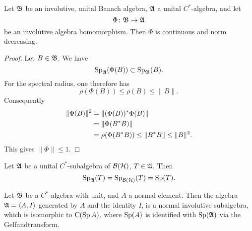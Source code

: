 \begin{prop}\label{conthomo}
 Let $\mathfrak{B}$ be an involutive, unital Banach algebra, $\mathfrak{A}$ a unital $C^*$-algebra, and let
\[
  \Phi \colon \mathfrak{B} \to \mathfrak{A} 
\]
be an involutive algebra homomorphism.
Then $\Phi$ is continuous and norm decreasing.
\end{prop}
\begin{proof}
 Let $B \in \mathfrak{B}$. We have
\[
  \operatorname{Sp}_{\mathfrak{A}} (\Phi (B)) \subset \operatorname{Sp}_{\mathfrak{B}} (B).
\]
For the spectral radius, one therefore has
\[
 \rho (\Phi (B)) \leq \rho ( B) \leq \| B \|.
\]
Consequently
\begin{align*}
 \| \Phi (B) \|^2 &= \| (\Phi (B))^{*} \Phi (B) \| \\
		  &= \| \Phi (B ^{*} B) \| \\
		  &= \rho ( \Phi(B ^{*} B)) \leq \| B^{*} B \| \leq \| B \| ^2.
\end{align*}
This gives $ \| \Phi \| \leq 1$.
 \end{proof}

\begin{cor}
 Let $\mathfrak{A}$ be a unital $C^*$-subalgebra of $\mathcal{B}(\mathcal{H})$, $T \in \mathfrak{A}$. Then 
\[
 \operatorname{Sp}_{\mathfrak{A}} (T) = \operatorname{Sp}_{\mathcal{B}(\mathcal{H})}(T) = \operatorname{Sp}(T).
\]
\end{cor}

\begin{prop}\label{boundedfunccalc}
 Let $\mathfrak{B}$ be a $C^*$-algebra with unit, and $A$ a normal element.
 Then the algebra $\mathfrak{A} = \left\langle A, I \right\rangle$ generated by $A$ and the identity $I$, is a
 normal involutive subalgebra, which is isomorphic to 
 $\operatorname{C} (\operatorname{Sp} A)$, where $\operatorname{Sp}(A)$ is identified with $\operatorname{Sp}(\mathfrak{A})$ via the Gelfandtransform.
\end{prop}


